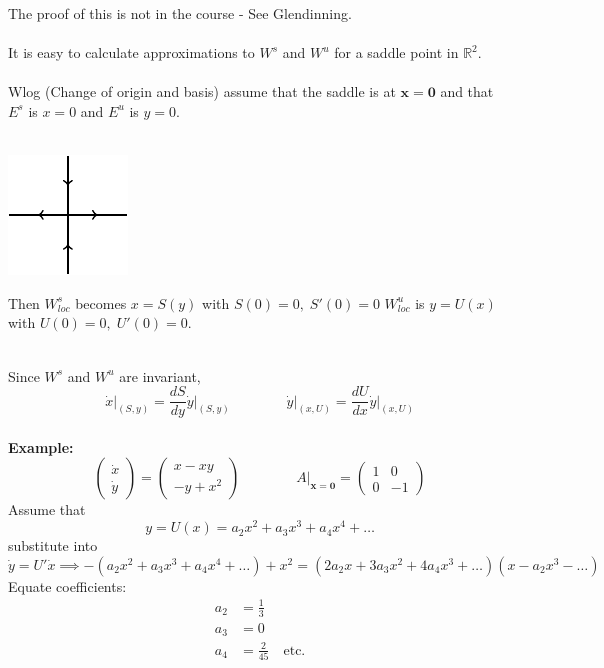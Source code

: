 \documentclass{article}
\newcommand{\example}{\textbf{Example:}}                    %
\begin{document}
The proof of this is not in the course - See Glendinning.
\\
\\
It is easy to calculate approximations to $W^s$ and $W^u$ for a saddle point
in $\mathbb{R}^2$.
\\
\\
Wlog (Change of origin and basis) assume that the saddle is at $\bm{x}=\bm{0}$
and that $E^s$ is $x=0$ and $E^u$ is $y=0$.
\\
\\
\begin{minipage}[c][0.2\textwidth][c]{0.2\textwidth}
\includegraphics{Fig17.pdf}
\end{minipage}
\begin{minipage}[c][0.2\textwidth][c]{0.6\textwidth}
Then $W^s_{loc}$ becomes $x = S(y)$ with $S(0) =0, \; S'(0)=0$ 
$W^u_{loc}$ is $y = U(x)$ with $U(0) =0, \; U'(0)=0$.
\end{minipage}
\\
Since $W^s$ and $W^u$ are invariant,
\\
\[
 \left. \dot{x}\right|_{(S,y)} = \frac{dS}{dy} \left.\dot{y}\right|_{(S,y)} \qquad \qquad
 \left.\dot{y}\right|_{(x,U)} = \frac{dU}{dx} \left.\dot{y}\right|_{(x,U)}
\]
\\
\example\ 
\[ \left( \begin{array}{c} \dot{x} \\ \dot{y} \end{array} \right) = 
\left( \begin{array}{c} x - xy \\ -y+x^2 \end{array} \right) \qquad \qquad
A|_{\bm{x} = \bm{0}} = \left( \begin{array}{cr} 1 & 0 \\ 0 & -1 \end{array} \right) \]
Assume that
\[ y = U(x) = a_2 x^2 + a_3 x^3 + a_4 x^4 + \dots \]
substitute into 
\[ \dot{y} = U'\dot{x}  \implies -(a_2x^2+a_3x^3 + a_4x^4 + \dots) + x^2 
= (2a_2x + 3a_3x^2 + 4a_4x^3 + \dots)(x - a_2x^3 - \dots ) \]
Equate coefficients:
\begin{align*}
a_2 &= \frac{1}{3} \\
a_3 &= 0 \\
a_4 &= \frac{2}{45} \quad \mbox{etc.}
\end{align*}
\end{document}
